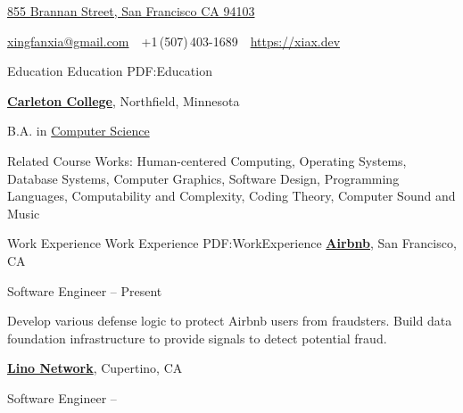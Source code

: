 \documentclass[letterpaper,MMMyyyy,nonstopmode]{simpleresumecv}
\newcommand{\CVAuthor}{Xingfan Xia}
\newcommand{\CVWebpage}{https://xiax.dev}
\begin{document}

\Title{\CVAuthor}

\begin{SubTitle}
\href{https://www.google.com/maps/place/855+Brannan,+San+Francisco,+CA+94103}
{855 Brannan Street, San Francisco CA 94103}
\par
\href{mailto:xingfanxia@gmail.com}
{xingfanxia@gmail.com}
\,\SubBulletSymbol\,
+1\,(507)\,403-1689
\,\SubBulletSymbol\,
\href{\CVWebpage}
{\url{\CVWebpage}}
\end{SubTitle}

\begin{Body}


\Section
{Education}
{Education}
{PDF:Education}

\Entry
\href{https://www.carleton.edu/}
{\textbf{Carleton College}},
Northfield, Minnesota

\Gap
\BulletItem
B.A. in
\href{https://apps.carleton.edu/curricular/cs/}
{Computer Science}
\hfill
{}
\begin{Detail}
\SubBulletItem
Related Course Works: Human-centered Computing, Operating Systems, Database Systems, Computer Graphics, Software Design, Programming Languages, Computability and Complexity, Coding Theory, Computer Sound and Music

\end{Detail}


\Section
{Work\newline
Experience}
{Work Experience}
{PDF:WorkExperience}
\Entry
\href{https://press.airbnb.com/about-us/}
{\textbf{Airbnb}},
San Francisco, CA

\Gap
\BulletItem
Software Engineer
\hfill
{} --
Present
\begin{Detail}
\SubBulletItem
Develop various defense logic to protect Airbnb users from fraudsters.
\SubBulletItem
Build data foundation infrastructure to provide signals to detect potential fraud.
\end{Detail}

\BigGap
\Entry
\href{https://lino.network/}
{\textbf{Lino Network}},
Cupertino, CA

\Gap
\BulletItem
Software Engineer
\hfill
{} --


\end{Body}
\end{document}
